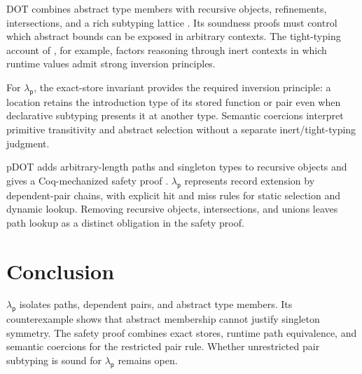 \documentclass[acmsmall,screen,nonacm]{acmart}
\newcommand{\lambdap}{\ensuremath{\lambda_{\mathsf p}}}
\begin{document}
DOT combines abstract type members with recursive objects, refinements,
intersections, and a rich subtyping lattice
\citep{amin2014foundations,rompf2016dot}. Its soundness proofs must control
which abstract bounds can be exposed in arbitrary contexts. The tight-typing
account of \citet{rapoport2017simple}, for example, factors reasoning through
inert contexts in which runtime values admit strong inversion principles.

For \lambdap{}, the exact-store invariant provides the required inversion
principle: a location retains the introduction type of its stored
function or pair even when declarative subtyping presents it at another type.
Semantic coercions interpret primitive transitivity and abstract selection
without a separate inert/tight-typing judgment.

pDOT adds arbitrary-length paths and singleton types to recursive objects and
gives a Coq-mechanized safety proof \citep{rapoport2019pdot}. \lambdap{}
represents record extension by dependent-pair chains, with explicit hit and
miss rules for static selection and dynamic lookup. Removing recursive
objects, intersections, and unions leaves path lookup as a distinct obligation
in the safety proof.

\section{Conclusion}

\lambdap{} isolates paths, dependent pairs, and abstract type members. Its
counterexample shows that abstract membership cannot justify singleton
symmetry. The safety proof combines exact stores, runtime path equivalence, and
semantic coercions for the restricted pair rule. Whether unrestricted pair
subtyping is sound for \lambdap{} remains open.



\end{document}
